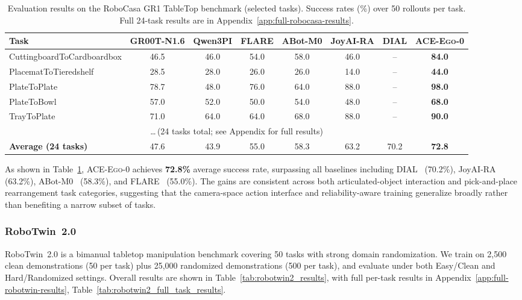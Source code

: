 \documentclass{llmxive}
\providecommand{\OURS}{\textsc{ACE-Ego-0}\xspace}
\providecommand{\Ours}{\OURS}
\providecommand{\arraystretch}{1.1}
\begin{document}
\begin{table}[t]
\centering
\vspace{0.3em}
\small
\renewcommand{\arraystretch}{1.1}
\setlength{\tabcolsep}{4pt}
\begin{tabular*}{\textwidth}{@{\extracolsep{\fill}}lccccccc}
\hline
\textbf{Task} & GR00T-N1.6 & Qwen3PI & FLARE & ABot-M0 & JoyAI-RA & DIAL & \Ours \\
\hline
CuttingboardToCardboardbox & 46.5 & 46.0 & 54.0 & 58.0 & 46.0 & -- & \textbf{84.0} \\
PlacematToTieredshelf      & 28.5 & 28.0 & 26.0 & 26.0 & 14.0 & -- & \textbf{44.0} \\
PlateToPlate               & 78.7 & 48.0 & 76.0 & 64.0 & 88.0 & -- & \textbf{98.0} \\
PlateToBowl                & 57.0 & 52.0 & 50.0 & 54.0 & 48.0 & -- & \textbf{68.0} \\
TrayToPlate                & 71.0 & 64.0 & 64.0 & 68.0 & 88.0 & -- & \textbf{90.0} \\
\multicolumn{8}{c}{\ldots\,(24 tasks total; see Appendix for full results)} \\
\hline
\textbf{Average (24 tasks)} & 47.6 & 43.9 & 55.0 & 58.3 & 63.2 & 70.2 & \textbf{72.8} \\
\hline
\end{tabular*}
\caption{Evaluation results on the RoboCasa GR1 TableTop benchmark (selected tasks). Success rates (\%) over 50 rollouts per task. Full 24-task results are in Appendix~\ref{app:full-robocasa-results}.}
\label{tab:robocasa_gr1_results}
\end{table}

As shown in Table~\ref{tab:robocasa_gr1_results}, \Ours achieves \textbf{72.8\%} average success rate, surpassing all baselines including DIAL~\cite{chen2026dial} (70.2\%), JoyAI-RA~\cite{zhang2026joyaira} (63.2\%), ABot-M0~\cite{yang2026abot} (58.3\%), and FLARE~\cite{pmlr-v305-zheng25a} (55.0\%). The gains are consistent across both articulated-object interaction and pick-and-place rearrangement task categories, suggesting that the camera-space action interface and reliability-aware training generalize broadly rather than benefiting a narrow subset of tasks.

\subsubsection{RoboTwin~2.0}
\label{sec:robotwin}

RoboTwin~2.0 is a bimanual tabletop manipulation benchmark covering 50 tasks with strong domain randomization. 
We train on 2,500 clean demonstrations (50 per task) plus 25,000 randomized demonstrations (500 per task), and evaluate under both Easy/Clean and Hard/Randomized settings. Overall results are shown in Table~\ref{tab:robotwin2_results}, with full per-task results in Appendix~\ref{app:full-robotwin-results}, Table~\ref{tab:robotwin2_full_task_results}.
\end{document}
